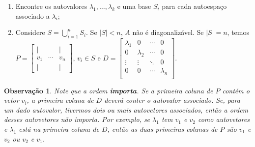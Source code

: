 \documentclass{article}
\newtheorem*{remark}{Observação}
\begin{document}
\begin{enumerate}
	\item Encontre os autovalores $\lambda_1, \dots, \lambda_k$ e uma base $S_i$ para cada autoespaço associado a $\lambda_i$;
	\item Considere $\displaystyle{S = \bigcup_{i=1}^{n}S_i }$. Se $|S|<n$, $A$ não é diagonalizável. Se $|S| = n$, temos $P = \begin{bmatrix}
	\vert &  & \vert \\
	v_1 & \cdots & v_n\\
	\vert &  & \vert 
	\end{bmatrix}$, $v_i\in S$ e $D = \begin{bmatrix}
	\lambda_1 & 0 & \cdots & 0 \\
	0 & \lambda_2 & \cdots & 0 \\
	\vdots & \vdots & \ddots & 0 \\
	0 & 0 & \cdots & \lambda_n \\
	\end{bmatrix}$.
\end{enumerate} 

\begin{remark}
	Note que a ordem \textbf{importa}. Se a primeira coluna de $P$ contém o vetor $v_i$, a primeira coluna de $D$ deverá conter o autovalor associado. Se, para um dado autovalor, tivermos dois ou mais autovetores associados, então a ordem desses autovetores não importa. Por exemplo, se $\lambda_1$ tem $v_1$ e $v_2$ como autovetores e $\lambda_1$ está na primeira coluna de $D$, então as duas primeiras colunas de $P$ são $v_1$ e $v_2$ ou $v_2$ e $v_1$. 
\end{remark}
\end{document}
